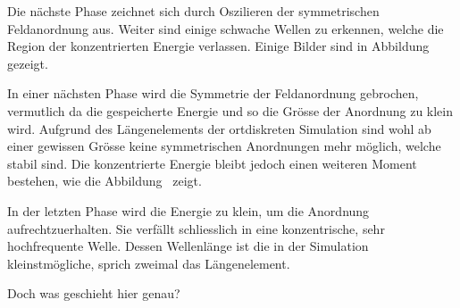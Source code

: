 Die nächste Phase zeichnet sich durch Oszilieren der symmetrischen Feldanordnung aus. 
Weiter sind einige schwache Wellen zu erkennen, welche die Region der konzentrierten Energie verlassen.
Einige Bilder sind in Abbildung~ gezeigt.

In einer nächsten Phase wird die Symmetrie der Feldanordnung gebrochen, vermutlich da die gespeicherte Energie und so die Grösse der Anordnung zu klein wird.
Aufgrund des Längenelements der ortdiskreten Simulation sind wohl ab einer gewissen Grösse keine symmetrischen Anordnungen mehr möglich, welche stabil sind.
Die konzentrierte Energie bleibt jedoch einen weiteren Moment bestehen, wie die Abbildung~ zeigt.

In der letzten Phase wird die Energie zu klein, um die Anordnung aufrechtzuerhalten. 
Sie verfällt schliesslich in eine konzentrische, sehr hochfrequente Welle. 
Dessen Wellenlänge ist die in der Simulation kleinstmögliche, sprich zweimal das Längenelement.


Doch was geschieht hier genau? 

